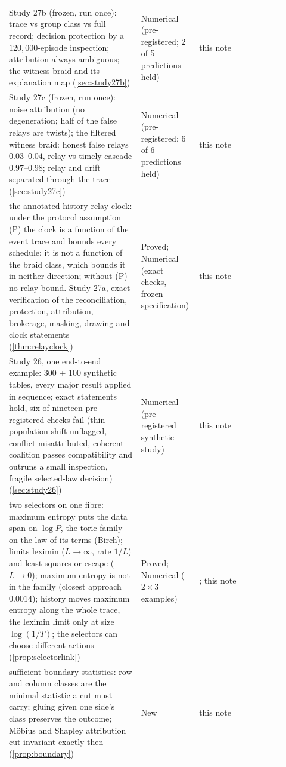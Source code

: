 \documentclass[11pt]{article}
\theoremstyle{definition}\newtheorem{definition}[theorem]{Definition}\newtheorem{remark}[theorem]{Remark}\newtheorem{example}[theorem]{Example}\newtheorem{problem}[theorem]{Open problem}\crefname{problem}{Problem}{Problems}
\begin{document}
{\begin{longtable}{p{0.46\linewidth}p{0.16\linewidth}p{0.3\linewidth}}
\rowcolor{stNew} Study 27b (frozen, run once): trace vs group class vs full record; decision protection by a $120{,}000$-episode inspection; attribution always ambiguous; the witness braid and its explanation map (\cref{sec:study27b}) & Numerical (pre-registered; 2 of 5 predictions held) & this note\\
\rowcolor{stNew} Study 27c (frozen, run once): noise attribution (no degeneration; half of the false relays are twists); the filtered witness braid: honest false relays $0.03$--$0.04$, relay vs timely cascade $0.97$--$0.98$; relay and drift separated through the trace (\cref{sec:study27c}) & Numerical (pre-registered; 6 of 6 predictions held) & this note\\
\rowcolor{stNew} the annotated-history relay clock: under the protocol assumption (P) the clock is a function of the event trace and bounds every schedule; it is not a function of the braid class, which bounds it in neither direction; without (P) no relay bound. Study 27a, exact verification of the reconciliation, protection, attribution, brokerage, masking, drawing and clock statements (\cref{thm:relayclock}) & Proved; Numerical (exact checks, frozen specification) & this note\\
\rowcolor{stNew} Study 26, one end-to-end example: 300 + 100 synthetic tables, every major result applied in sequence; exact statements hold, six of nineteen pre-registered checks fail (thin population shift unflagged, conflict misattributed, coherent coalition passes compatibility and outruns a small inspection, fragile selected-law decision) (\cref{sec:study26}) & Numerical (pre-registered synthetic study) & this note\\
\rowcolor{stNew} two selectors on one fibre: maximum entropy puts the data span on $\log P$, the toric family on the law of its terms (Birch); limits leximin ($L\to\infty$, rate $1/L$) and least squares or escape ($L\to0$); maximum entropy is not in the family (closest approach $0.0014$); history moves maximum entropy along the whole trace, the leximin limit only at size $\log(1/T)$; the selectors can choose different actions (\cref{prop:selectorlink}) & Proved; Numerical ($2\times3$ examples) & \cite{Csiszar1975}; this note\\
\rowcolor{stNew} sufficient boundary statistics: row and column classes are the minimal statistic a cut must carry; gluing given one side's class preserves the outcome; Möbius and Shapley attribution cut-invariant exactly then (\cref{prop:boundary}) & New & this note\\

\end{longtable}}
\end{document}
